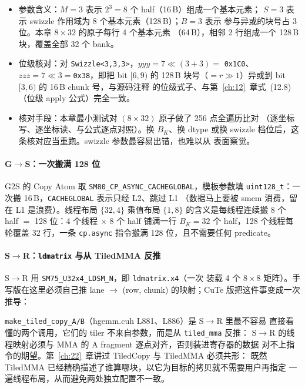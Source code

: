 \begin{itemize}
  \item 参数含义：$M=3$ 表示 $2^3=8$ 个 half（16\,B）组成一个基本元素；
        $S=3$ 表示 swizzle 作用域为 8 个基本元素（128\,B）；$B=3$ 表示
        参与异或的块号占 3 位。本章 $8\times32$ 的原子每行 4 个基本元素
        （64\,B），相邻 2 行组成一个 128\,B 块，覆盖全部 32 个 bank。
  \item 位级核对：对 \texttt{Swizzle\allowbreak{}<3,\allowbreak{}3,\allowbreak{}3>}，$\mathit{yyy}=7\ll(3+3)=$
        \texttt{0x1C0}、$\mathit{zzz}=7\ll3=$\texttt{0x38}，即把 bit $[6,9)$ 的
        128\,B 块号（$=r\gg1$）异或到 bit $[3,6)$ 的 16\,B chunk 号，与源码注释
        的位级式子、与第~\ref{ch:12}~章式~(12.8)（位级 apply 公式）完全一致。
  \item 核对手段：本章最小测试对 $(8\times32)$ 原子做了 256 点全遍历比对
        （逐坐标写、逐坐标读、与公式逐点对照）。换 $B_K$、换 dtype 或换
        swizzle 档位后，这条核对应当重跑。swizzle 参数最容易出错，也难以从
        表面察觉。
\end{itemize}

\paragraph{G$\to$S：一次搬满 128 位}

G2S 的 Copy Atom 取
\texttt{SM80\_\allowbreak{}CP\_\allowbreak{}ASYNC\_\allowbreak{}}\allowbreak\texttt{CACHEGLOBAL}，模板参数填
\texttt{uint128\_t}：一次搬 16\,B，\texttt{CACHEGLOBAL} 表示只经 L2、跳过 L1
（数据马上要被 smem 消费，留在 L1 是浪费）。线程布局 $\{32,4\}$ 乘值布局
$\{1,8\}$ 的含义是每线程连续搬 8 个 half $=$ 128 位：4 个线程 $\times$ 8 个 half
铺满一行 $B_K=32$ 个 half，128 个线程每轮覆盖 32 行，一条 \texttt{cp.async}
指令搬满 128 位，且不需要任何 predicate。

\paragraph{S$\to$R：\texttt{ldmatrix} 与从 TiledMMA 反推}

S$\to$R 用 \texttt{SM75\_\allowbreak{}U32x4\_\allowbreak{}LDSM\_\allowbreak{}N}，即 \texttt{ldmatrix.x4}（一次
装载 4 个 $8\times8$ 矩阵）。手写版在这里必须自己推 lane $\to$ (row, chunk)
的映射；CuTe 版把这件事变成一次推导：

\texttt{make\_\allowbreak{}tiled\_\allowbreak{}copy\_\allowbreak{}A/\allowbreak{}B}（hgemm.cuh L881、L886）是 S$\to$R 里最不容易
直接看懂的两个调用，它们的 tiler 不来自参数，而是从 \texttt{tiled\_mma} 反推：
S$\to$R 的线程映射必须与 MMA 的 A fragment 逐点对齐，否则装进寄存器的数据
对不上指令的期望。第~\ref{ch:22}~章讲过 TiledCopy 与 TiledMMA 必须共形：
既然 TiledMMA 已经精确描述了谁算哪块，以它为目标的拷贝就不需要用户再指定
一遍线程布局，从而避免两处独立配置不一致。

